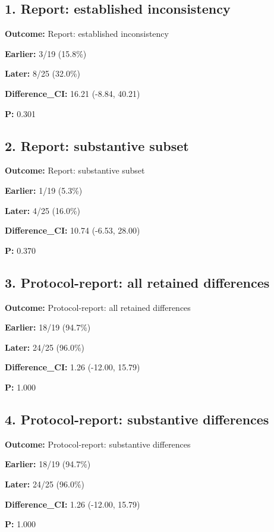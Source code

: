 \documentclass[10pt,a4paper]{article}
\begin{document}
\subsection*{1.\allowbreak{} Report: established inconsistency}
\textbf{Outcome:} Report: established inconsistency\par
\textbf{Earlier:} 3/\allowbreak{}19 (15.\allowbreak{}8\%)\par
\textbf{Later:} 8/\allowbreak{}25 (32.\allowbreak{}0\%)\par
\textbf{Difference\_\allowbreak{}CI:} 16.\allowbreak{}21 (-\allowbreak{}8.\allowbreak{}84, 40.\allowbreak{}21)\par
\textbf{P:} 0.\allowbreak{}301\par
\subsection*{2.\allowbreak{} Report: substantive subset}
\textbf{Outcome:} Report: substantive subset\par
\textbf{Earlier:} 1/\allowbreak{}19 (5.\allowbreak{}3\%)\par
\textbf{Later:} 4/\allowbreak{}25 (16.\allowbreak{}0\%)\par
\textbf{Difference\_\allowbreak{}CI:} 10.\allowbreak{}74 (-\allowbreak{}6.\allowbreak{}53, 28.\allowbreak{}00)\par
\textbf{P:} 0.\allowbreak{}370\par
\subsection*{3.\allowbreak{} Protocol-\allowbreak{}report: all retained differences}
\textbf{Outcome:} Protocol-\allowbreak{}report: all retained differences\par
\textbf{Earlier:} 18/\allowbreak{}19 (94.\allowbreak{}7\%)\par
\textbf{Later:} 24/\allowbreak{}25 (96.\allowbreak{}0\%)\par
\textbf{Difference\_\allowbreak{}CI:} 1.\allowbreak{}26 (-\allowbreak{}12.\allowbreak{}00, 15.\allowbreak{}79)\par
\textbf{P:} 1.\allowbreak{}000\par
\subsection*{4.\allowbreak{} Protocol-\allowbreak{}report: substantive differences}
\textbf{Outcome:} Protocol-\allowbreak{}report: substantive differences\par
\textbf{Earlier:} 18/\allowbreak{}19 (94.\allowbreak{}7\%)\par
\textbf{Later:} 24/\allowbreak{}25 (96.\allowbreak{}0\%)\par
\textbf{Difference\_\allowbreak{}CI:} 1.\allowbreak{}26 (-\allowbreak{}12.\allowbreak{}00, 15.\allowbreak{}79)\par
\textbf{P:} 1.\allowbreak{}000\par
\end{document}
